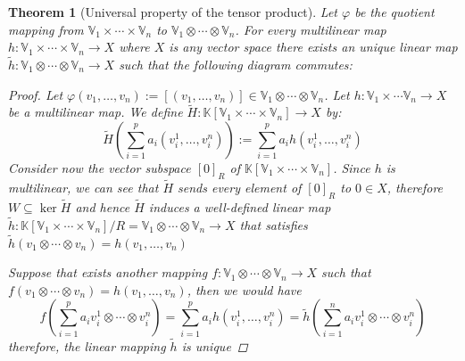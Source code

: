 \documentclass[11pt,a4paper,openright,oneside]{book}
\numberwithin{equation}{section}
\newtheorem{thm0}[defn0]{Theorem}
\newenvironment{theorem}{\bigskip \begin{thm0}}{\end{thm0}}
\begin{document}
\begin{theorem}[Universal property of the tensor product]
    Let $\varphi$ be the quotient mapping from $\mathbb{V}_1 \times \cdots \times \mathbb{V}_n$ to $\mathbb{V}_1 \otimes \cdots \otimes \mathbb{V}_n$. 
    For every multilinear map $h: \mathbb{V}_1 \times \cdots \times \mathbb{V}_n \rightarrow X$ where $X$ is any vector space there exists an unique linear map 
    $\tilde{h}: \mathbb{V}_1 \otimes \cdots \otimes \mathbb{V}_n \rightarrow X$ such that the following diagram commutes:

    \centering


\begin{proof}
    Let $\varphi(v_1, \dots, v_n) := [(v_1, \dots, v_n)] \in \mathbb{V}_1 \otimes \cdots \otimes \mathbb{V}_n$. Let $h : \mathbb{V}_1 \times \cdots \mathbb{V}_n \rightarrow X$ be a
    multilinear map. We define $\tilde H : \mathbb{K}[\mathbb{V}_1 \times \cdots \times \mathbb{V}_n] \rightarrow X$ by:
    $$\tilde H \left( \sum_{i=1}^p a_i (v_i^1, \dots, v_i^n) \right) := \sum_{i=1}^p a_i h(v_i^1, \dots, v_i^n) $$
    Consider now the vector subspace $[0]_R$ of $\mathbb{K}[\mathbb{V}_1 \times \cdots \times \mathbb{V}_n]$.
    Since $h$ is multilinear, we can see that $\tilde H$ sends every element of $[0]_R$ to
    $0 \in X$, therefore $W \subseteq \ker{ \tilde H}$ and hence $\tilde H$ induces a well-defined linear map $\tilde h: \mathbb{K}[\mathbb{V}_1 \times \cdots \times \mathbb{V}_n]/R = \mathbb{V}_1 \otimes \cdots \otimes \mathbb{V}_n \rightarrow X$
    that satisfies $\tilde h (v_1 \otimes \cdots \otimes v_n) = h(v_1, \dots, v_n)$

    Suppose that exists another mapping $f : \mathbb{V}_1 \otimes \cdots \otimes \mathbb{V}_n \rightarrow X$ such that $f(v_1 \otimes \cdots \otimes v_n) = h(v_1, \dots, v_n)$, then we would have
    $$f \left( \sum_{i=1}^p a_i v_i^1 \otimes \cdots \otimes v_i^n \right) = \sum_{i=1}^p a_i h(v_i^1, \dots, v_i^n) = \tilde h \left( \sum_{i=1}^n a_i v_i^1 \otimes \cdots \otimes v_i^n \right)$$
    therefore, the linear mapping $\tilde h$ is unique
\end{proof}
\end{theorem}
\end{document}
